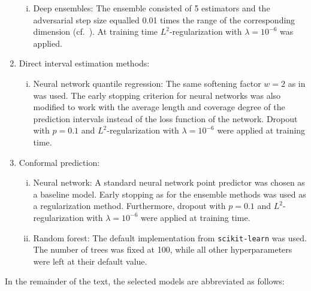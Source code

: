 \documentclass[smallcondensed]{svjour3}
\begin{document}
\begin{enumerate}
\begin{enumerate}[(i)]
            \item Deep ensembles: The ensemble consisted of 5 estimators and the adversarial step size equalled 0.01 times the range of the corresponding dimension (cf.\ \cite{lakshminarayanan2017simple}). At training time $L^2$-regularization with $\lambda=10^{-6}$ was applied.
        \end{enumerate}
        \item Direct interval estimation methods:
        \begin{enumerate}[(i)]
            \item Neural network quantile regression: The same softening factor $w=2$ as in \cite{romano2019conformalized,sesia2020comparison} was used. The early stopping criterion for neural networks was also modified to work with the average length and coverage degree of the prediction intervals instead of the loss function of the network. Dropout with $p=0.1$ and $L^2$-regularization with $\lambda=10^{-6}$ were applied at training time.
        \end{enumerate}
        \item Conformal prediction:
        \begin{enumerate}[(i)]
            \item Neural network: A standard neural network point predictor was chosen as a baseline model. Early stopping as for the ensemble methods was used as a regularization method. Furthermore, dropout with $p=0.1$ and $L^2$-regularization with $\lambda=10^{-6}$ were applied at training time.
            \item Random forest: The default implementation from \texttt{scikit-learn} \cite{scikit-learn} was used. The number of trees was fixed at 100, while all other hyperparameters were left at their default value.
        \end{enumerate}
    \end{enumerate}

    In the remainder of the text, the selected models are abbreviated as follows:
\end{document}
